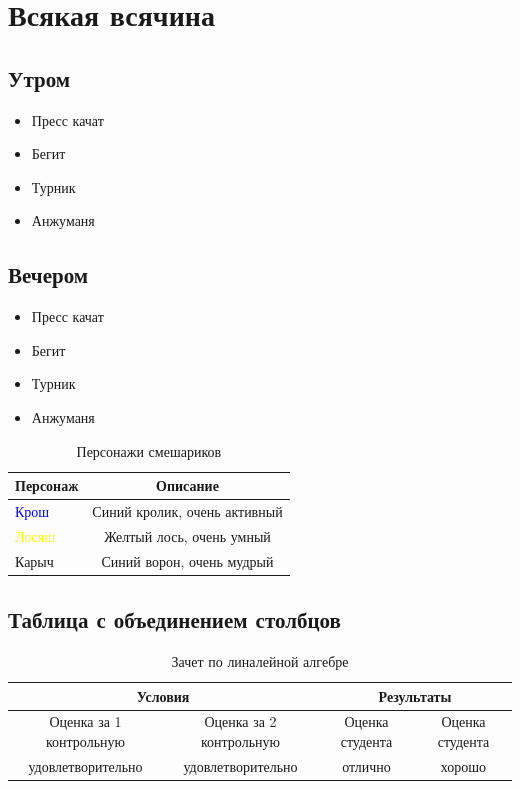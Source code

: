 \newpage
\pagecolor{white}
\chapter{Всякая всячина}
\section{Утром}

\begin{itemize}
    \item Пресс качат
    \item Бегит
    \item Турник
    \item Анжуманя
\end{itemize}


\section{Вечером}

\begin{itemize}
    \item Пресс качат
    \item Бегит
    \item Турник
    \item Анжуманя
\end{itemize}

    \begin{table}[h!]
        \centering
        \caption{Персонажи смешариков}
    \label{tab:smeshariki}
    \begin{tabular}{l|c}
        \hline
        \textbf{Персонаж} & \textbf{Описание} \\
        \hline
        \textcolor{blue}{Крош} & Синий кролик, очень активный \\
        \hline
        \textcolor{yellow}{Лосяш} & Желтый лось, очень умный \\
        \hline
        Карыч & Синий ворон, очень мудрый \\
        \hline
    \end{tabular}
\end{table}

\newpage
\section{Таблица с объединением столбцов}
\begin{table}[h!]
    \centering
    \caption{Зачет по линалейной алгебре}
    \label{tab:linal1}
    \begin{tabular}{|c|c|c|c|}
        \hline
        \multicolumn{2}{|c|}{Условия} & \multicolumn{2}{c|}{Результаты} \\
        \hline
        Оценка за 1 контрольную & Оценка за 2 контрольную & Оценка студента & Оценка студента \\
        \hline
        удовлетворительно & удовлетворительно & отлично & хорошо \\
        \hline
    \end{tabular}
\end{table}


